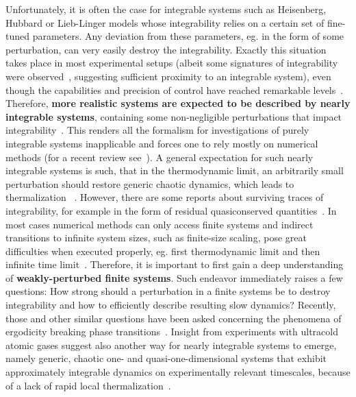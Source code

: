 Unfortunately, it is often the case for integrable systems such as Heisenberg, Hubbard or Lieb-Linger
models whose integrability relies on a certain set of fine-tuned parameters. Any deviation from these parameters, eg.
in the form of some perturbation, can very easily destroy the integrability. Exactly this situation takes place in most
experimental setups (albeit some signatures of integrability were observed~\autocite{Khemani2019}, suggesting sufficient
proximity to an integrable system),  even though the capabilities and precision of control have
reached remarkable levels~\autocite{Browaeys2020}. Therefore, \textbf{more realistic systems
    are expected to be described by nearly integrable systems}, containing some non-negligible perturbations that
impact integrability~\autocite{Zotos2004, Brandino2015}.
This renders all the formalism for investigations of purely
integrable systems inapplicable and forces one to rely mostly on numerical methods (for a recent review
see~\textcite{Bertini2021}).
A general expectation for such nearly integrable systems is such, that in the thermodynamic limit, an
arbitrarily small perturbation should restore generic chaotic dynamics, which leads to thermalization
~\autocite{LeBlond2021}. However, there
are some reports about surviving traces of integrability, for example in the form of residual quasiconserved
quantities~\autocite{Brandino2015}. In most cases numerical methods can only access finite
systems and indirect transitions to infinite system sizes, such as finite-size scaling, pose great difficulties
when executed properly, eg. first thermodynamic limit and then infinite time limit~\autocite{Sirker2014, CamposVenuti2010}.
Therefore, it is important to first gain a deep understanding of \textbf{weakly-perturbed finite systems}. Such
endeavor immediately raises a few questions: How strong should a perturbation in a finite
systems be to destroy integrability and how to efficiently describe resulting slow dynamics?
Recently, those and other similar questions have been asked concerning the phenomena of ergodicity breaking
phase transitions~\autocite{Suntajs2020,Suntajs2022}.
Insight from experiments with ultracold atomic gases suggest also another way for nearly integrable systems to emerge,
namely generic, chaotic one- and quasi-one-dimensional systems that exhibit approximately integrable dynamics on experimentally relevant timescales,
because of a lack of rapid local thermalization~\autocite{Polkovnikov2011863, Gopalakrishnan2023}.

